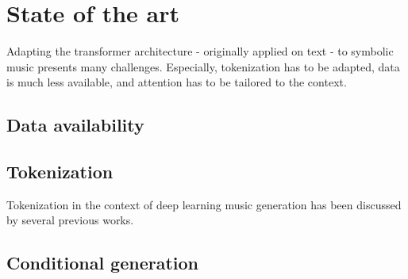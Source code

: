 \documentclass[11pt, a4paper]{article}
\begin{document}
\section*{State of the art}

Adapting the transformer architecture - originally applied on text - to symbolic music presents many challenges.
Especially, tokenization has to be adapted, data is much less available, and attention has to be tailored to the context\cite{leNaturalLanguageProcessing2024}.


\subsection*{Data availability}

\subsection*{Tokenization}

Tokenization in the context of deep learning music generation has been discussed by several previous works.
\cite{agarwalStructureinformedPositionalEncoding2024, makrisConditionalDrumsGeneration2022, sarmentoDadaGPDatasetTokenized2021, hsiaoCompoundWordTransformer2021, cournutEncodagesTablaturesPour2020}

\subsection*{Conditional generation}




\newpage

\printbibliography%
\end{document}
